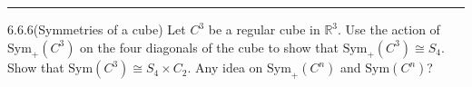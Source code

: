 \documentclass[a4paper, 12pt]{article}
\begin{document}
\noindent\rule{7in}{2.8pt}
\begin{problem}{6.6.6(Symmetries of a cube)}
Let \(C^3\) be a regular cube in \(\mathbb{R}^3\). Use the action of \(\text{Sym}_+(C^3)\) on the four diagonals of the cube to show that \(\text{Sym}_+(C^3)\cong S_4\). Show that 
\(\text{Sym}(C^3)\cong S_4\times C_2\). Any idea on \(\text{Sym}_+(C^n)\) and \(\text{Sym}(C^n)\)?
\end{problem}
\begin{solution}
    
\end{solution}
\end{document}
